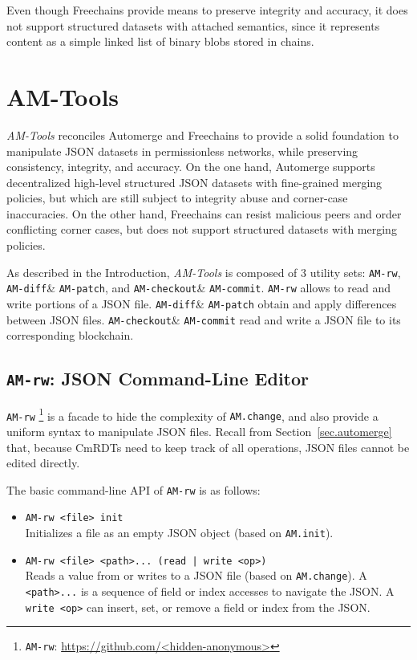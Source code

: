 \documentclass[12pt]{article}
\newcommand{\AMT}      {\emph{AM-Tools}\xspace}
\newcommand{\code}[1]  {\texttt{\footnotesize{#1}}}
\newcommand{\amrw}       {\texttt{AM-rw}\xspace}
\newcommand{\amdiff}     {\texttt{AM-diff}\xspace}
\newcommand{\ampatch}    {\texttt{AM-patch}\xspace}
\newcommand{\amcheckout} {\texttt{AM-checkout}\xspace}
\newcommand{\amcommit}   {\texttt{AM-commit}\xspace}
\begin{document}
Even though Freechains provide means to preserve integrity and accuracy, it
does not support structured datasets with attached semantics, since it
represents content as a simple linked list of binary blobs stored in chains.

\section{AM-Tools}
\label{sec.amtools}

\AMT reconciles Automerge and Freechains to provide a solid foundation to
manipulate JSON datasets in permissionless networks, while preserving
consistency, integrity, and accuracy.
%
On the one hand, Automerge supports decentralized high-level structured JSON
datasets with fine-grained merging policies, but which are still subject to
integrity abuse and corner-case inaccuracies.
%
On the other hand, Freechains can resist malicious peers and order conflicting
corner cases, but does not support structured datasets with merging policies.

As described in the Introduction, \AMT is composed of 3 utility sets:
    \amrw,
    \amdiff \& \ampatch, and
    \amcheckout \& \amcommit.
%
\amrw allows to read and write portions of a JSON file.
\amdiff \& \ampatch obtain and apply differences between JSON files.
\amcheckout \& \amcommit read and write a JSON file to its corresponding
blockchain.

\subsection{\amrw: JSON Command-Line Editor}

\amrw%
    \footnote{\amrw: \url{https://github.com/<hidden-anonymous>}}
is a facade to hide the complexity of \code{AM.change}, and also provide a
uniform syntax to manipulate JSON files.
Recall from Section~\ref{sec.automerge} that, because CmRDTs need to keep
track of all operations, JSON files cannot be edited directly.

The basic command-line API of \amrw is as follows:

\begin{itemize}
\item \code{AM-rw <file> init} \\
    Initializes a file as an empty JSON object (based on \code{AM.init}).
\item \code{AM-rw <file> <path>... (read | write <op>)} \\
    Reads a value from or writes to a JSON file (based on \code{AM.change}).
    A \code{<path>...} is a sequence of field or index accesses to navigate the
    JSON.
    A \code{write <op>} can insert, set, or remove a field or index from the
    JSON.
\end{itemize}
\end{document}
